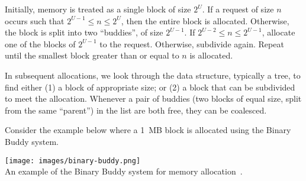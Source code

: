 Initially, memory is treated as a single block of size $2^{U}$. If a request of size $n$ occurs such that $2^{U-1} \leq n \leq 2^{U}$, then the entire block is allocated. Otherwise, the block is split into two ``buddies'', of size $2^{U-1}$. If $2^{U-2} \leq n \leq 2^{U-1}$, allocate one of the blocks of $2^{U-1}$ to the request. Otherwise, subdivide again. Repeat until the smallest block greater than or equal to $n$ is allocated. 

In subsequent allocations, we look through the data structure, typically a tree, to find either (1) a block of appropriate size; or (2) a block that can be subdivided to meet the allocation. Whenever a pair of buddies (two blocks of equal size, split from the same ``parent'') in the list are both free, they can be coalesced.

Consider the example below where a 1~MB block is allocated using the Binary Buddy system.

\begin{center}
\texttt{[image: images/binary-buddy.png]}\\
An example of the Binary Buddy system for memory allocation~\cite{osi}.
\end{center}



